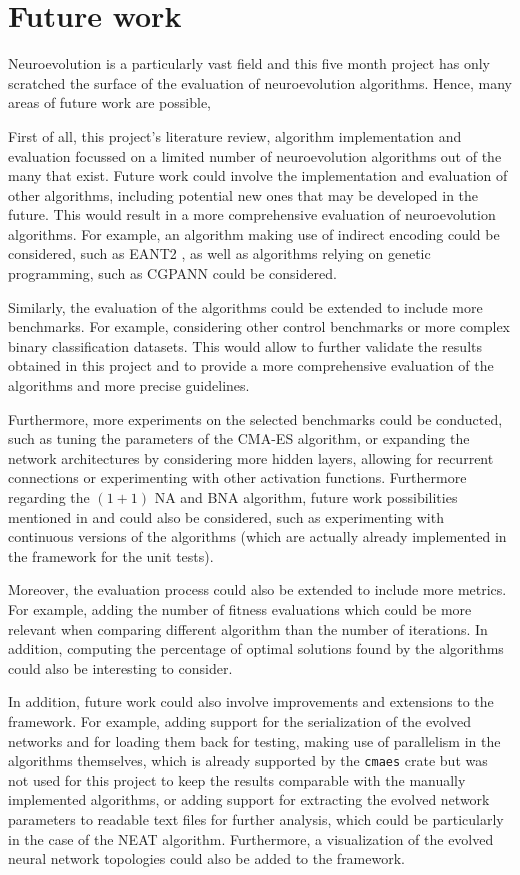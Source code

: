 \chapter{Future work}
\label{chap:future_work}

Neuroevolution is a particularly vast field and this five month project has only scratched the surface of the evaluation of neuroevolution algorithms. Hence, many areas of future work are possible,

First of all, this project's literature review, algorithm implementation and evaluation focussed on a limited number of neuroevolution algorithms out of the many that exist. Future work could involve
the implementation and evaluation of other algorithms, including potential new ones that may be developed in the future. This would result in a more comprehensive evaluation of neuroevolution algorithms.
For example, an algorithm making use of indirect encoding could be considered, such as EANT2 \cite{eant2}, as well as algorithms relying on genetic programming, such as CGPANN \cite{cgpann}
could be considered.

Similarly, the evaluation of the algorithms could be extended to include more benchmarks. For example, considering other control benchmarks or more complex binary classification datasets.
This would allow to further validate the results obtained in this project and to provide a more comprehensive evaluation of the algorithms and more precise guidelines.

Furthermore, more experiments on the selected benchmarks could be conducted, such as tuning the parameters of the CMA-ES algorithm, or expanding the network architectures by considering more
hidden layers, allowing for recurrent connections or experimenting with other activation functions. Furthermore regarding the $(1 + 1)$ NA and BNA algorithm, future work possibilities mentioned
in \cite{na} and \cite{bna} could also be considered, such as experimenting with continuous versions of the algorithms (which are actually already implemented in the framework for the unit tests).

Moreover, the evaluation process could also be extended to include more metrics. For example, adding the number of fitness evaluations which could be more relevant when comparing different algorithm
than the number of iterations. In addition, computing the percentage of optimal solutions found by the algorithms could also be interesting to consider.

In addition, future work could also involve improvements and extensions to the framework. For example, adding support for the serialization of the evolved networks and for loading them back for testing,
making use of parallelism in the algorithms themselves, which is already supported by the \texttt{cmaes} crate but was not used for this project to keep the results comparable with the manually
implemented algorithms, or adding support for extracting the evolved network parameters to readable text files for further analysis, which could be particularly in the case of the NEAT algorithm.
Furthermore, a visualization of the evolved neural network topologies could also be added to the framework.

